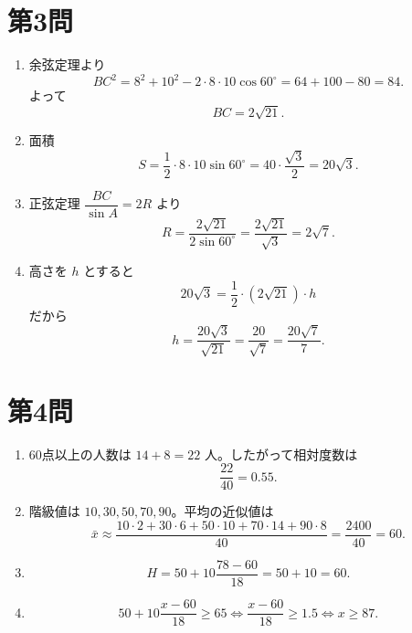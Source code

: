 \documentclass[a4paper,12pt]{jsarticle}
\begin{document}
\section*{第3問}
\begin{enumerate}[label=\arabic*.]
  \item 余弦定理より
  \[
  BC^2=8^2+10^2-2\cdot8\cdot10\cos60^\circ=64+100-80=84.
  \]
  よって
  \[
  BC=2\sqrt{21}.
  \]
  \item 面積
  \[
  S=\frac12\cdot8\cdot10\sin60^\circ
  =40\cdot\frac{\sqrt3}{2}=20\sqrt3.
  \]
  \item 正弦定理 \( \dfrac{BC}{\sin A}=2R \) より
  \[
  R=\frac{2\sqrt{21}}{2\sin60^\circ}
  =\frac{2\sqrt{21}}{\sqrt3}=2\sqrt7.
  \]
  \item 高さを \(h\) とすると
  \[
  20\sqrt3=\frac12\cdot(2\sqrt{21})\cdot h
  \]
  だから
  \[
  h=\frac{20\sqrt3}{\sqrt{21}}=\frac{20}{\sqrt7}=\frac{20\sqrt7}{7}.
  \]
\end{enumerate}

\section*{第4問}
\begin{enumerate}[label=\arabic*.]
  \item 60点以上の人数は \(14+8=22\) 人。したがって相対度数は
  \[
  \frac{22}{40}=0.55.
  \]
  \item 階級値は \(10,30,50,70,90\)。平均の近似値は
  \[
  \bar{x}\approx\frac{10\cdot2+30\cdot6+50\cdot10+70\cdot14+90\cdot8}{40}
  =\frac{2400}{40}=60.
  \]
  \item
  \[
  H=50+10\frac{78-60}{18}=50+10=60.
  \]
  \item
  \[
  50+10\frac{x-60}{18}\ge65
  \iff \frac{x-60}{18}\ge1.5
  \iff x\ge87.
  \]
\end{enumerate}
\end{document}
